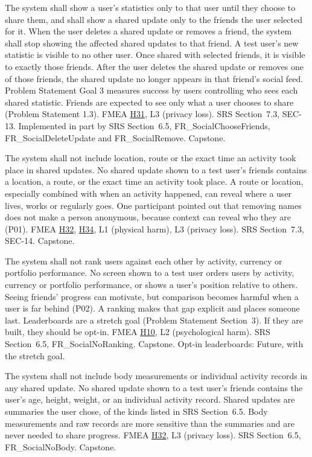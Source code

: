 \documentclass{article}
\newcommand{\hazref}[1]{\hyperref[#1]{#1}}
\begin{document}
\begin{description}

{The system shall show a user's statistics only to that user until they choose
to share them, and shall show a shared update only to the friends the user
selected for it. When the user deletes a shared update or removes a friend, the
system shall stop showing the affected shared updates to that friend.}
{A test user's new statistic is visible to no other user. Once shared with
selected friends, it is visible to exactly those friends. After the user
deletes the shared update or removes one of those friends, the shared update
no longer appears in that friend's social feed.}
{Problem Statement Goal 3 measures success by users controlling who sees each
shared statistic. Friends are expected to see only what a user chooses to
share (Problem Statement 1.3).}
{FMEA \hazref{H31}, L3 (privacy loss).}
{SRS Section~7.3, SEC-13. Implemented in part by SRS
Section~6.5, FR\_SocialChooseFriends, FR\_SocialDeleteUpdate and
FR\_SocialRemove.}
{Capstone.}

{The system shall not include location, route or the exact time an activity
took place in shared updates.}
{No shared update shown to a test user's friends contains a location, a route,
or the exact time an activity took place.}
{A route or location, especially combined with when an activity happened, can
reveal where a user lives, works or regularly goes. One participant pointed out
that removing names does not make a person anonymous, because context can
reveal who they are (P01).}
{FMEA \hazref{H32}, \hazref{H34}, L1 (physical harm), L3 (privacy loss).}
{SRS Section~7.3, SEC-14.}
{Capstone.}

{The system shall not rank users against each other by activity, currency or
portfolio performance.}
{No screen shown to a test user orders users by activity, currency or
portfolio performance, or shows a user's position relative to others.}
{Seeing friends' progress can motivate, but comparison becomes harmful when a
user is far behind (P02). A ranking makes that gap explicit and places someone
last. Leaderboards are a stretch goal (Problem Statement Section~3). If they are
built, they should be opt-in.}
{FMEA \hazref{H10}, L2 (psychological harm).}
{SRS Section~6.5, FR\_SocialNoRanking.}
{Capstone. Opt-in leaderboards: Future, with the stretch goal.}


{The system shall not include body measurements or individual activity records
in any shared update.}
{No shared update shown to a test user's friends contains the user's age,
height, weight, or an individual activity record.}
{Shared updates are summaries the user chose, of the kinds listed in SRS
Section~6.5. Body measurements and raw records are more sensitive than the
summaries and are never needed to share progress.}
{FMEA \hazref{H32}, L3 (privacy loss).}
{SRS Section~6.5, FR\_SocialNoBody.}
{Capstone.}


\end{description}
\end{document}
